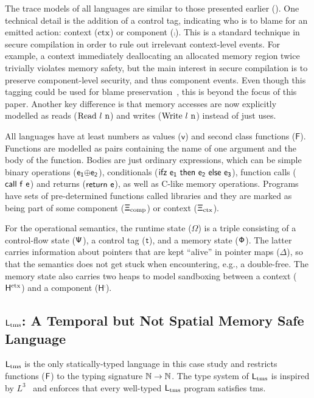 \documentclass[acmsmall]{acmart}
\theoremstyle{definition}
\begin{document}
{
  \renewcommand{\src}[1]{\mathsf{#1}}
The trace models of all languages are similar to those presented earlier ().
One technical detail is the addition of a control tag, indicating who is to blame for an emitted action: context ($\text{ctx}$) or component ($\comp$).
This is a standard technique in secure compilation in order to rule out irrelevant context-level events. 
For example, a context immediately deallocating an allocated memory region twice trivially violates memory safety, but the main interest in secure compilation is to preserve component-level security, and thus component events.
Even though this tagging could be used for blame preservation~\cite{patrignani2023blame}, this is beyond the focus of this paper.
Another key difference is that memory accesses are now explicitly modelled as reads ($\src{\ev{Read\ \loc\ n}}$) and writes ($\src{\ev{Write\ \loc\ n}}$) instead of just uses.

All languages have at least numbers as values ($\src{v}$) and second class functions ($\src{F}$).
Functions are modelled as pairs containing the name of one argument and the body of the function.
Bodies are just ordinary expressions, which can be simple binary operations ($\src{\lbinop{\expr[_1]}{\expr[_2]}}$), conditionals ($\src{\lifz{\expr[_1]}{\expr[_2]}{\expr[_3]}}$), function calls ($\src{\lcall{f}{e}}$) and returns ($\src{\lreturn{\expr}}$), as well as C-like memory operations. 
Programs have sets of pre-determined functions called libraries and they are marked as being part of some component ($\src{\library_{\comp}}$) or context ($\src{\library_{\ctx}}$).

For the operational semantics, the runtime state ($\src{\Omega}$) is a triple consisting of a control-flow state ($\src{\cfstate}$), a control tag ($\src{\sandboxtag{}}$), and a memory state ($\src{\memstate}$). 
The latter carries information about pointers that are kept ``alive'' in pointer maps ($\src{\Delta}$), so that the semantics does not get stuck when encountering, e.g., a double-free.
The memory state also carries two heaps to model sandboxing between a context ($\src{H^{\ctx}}$) and a component ($\src{H^{\comp}}$).

}

\subsection{$\src{L_{\tmssafe}}$: A Temporal but Not Spatial Memory Safe Language}\label{subsec:ltms}

$\src{L_{\tmssafe}}$ is the only statically-typed language in this case study and restricts functions ($\src{F}$) to the typing signature $\src{\natt\to\natt}$. 
The type system of $\src{L_{\tmssafe}}$ is inspired by $L^{3}$~\cite{morrisett2005L3,scherer2018fabulous} and enforces that every well-typed $\src{L_{\tmssafe}}$ program satisfies \gls*{tms}.
\end{document}
